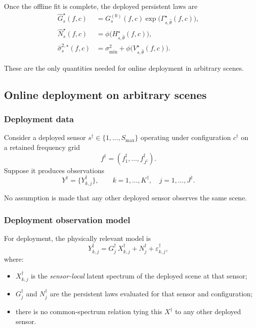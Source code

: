 Once the offline fit is complete, the deployed persistent laws are
\begin{align}
\widehat G_s^\star(f,c)
&=
G_s^{(0)}(f,c)
\exp\!\bigl(
\Gamma_{s,\widehat\theta}^\star(f,c)
\bigr),
\label{eq:deployed-persistent-gain}
\\
\widehat N_s^\star(f,c)
&=
\phi\!\bigl(
H_{s,\widehat\theta}^\star(f,c)
\bigr),
\label{eq:deployed-persistent-floor}
\\
\widehat \sigma_s^{2,\star}(f,c)
&=
\sigma_{\min}^2
+
\phi\!\bigl(
V_{s,\widehat\theta}^\star(f,c)
\bigr).
\label{eq:deployed-persistent-var}
\end{align}

These are the only quantities needed for online deployment in arbitrary
scenes.

\subsection{Online deployment on arbitrary scenes}

\subsubsection{Deployment data}

Consider a deployed sensor $s^\dagger\in\{1,\dots,S_{\max}\}$ operating under
configuration $c^\dagger$ on a retained frequency grid
\[
f^\dagger=(f^\dagger_1,\dots,f^\dagger_{J^\dagger}).
\]
Suppose it produces observations
\[
Y^\dagger=\{Y^\dagger_{k,j}\},
\qquad
k=1,\dots,K^\dagger,\quad
j=1,\dots,J^\dagger.
\]

No assumption is made that any other deployed sensor observes the same scene.

\subsubsection{Deployment observation model}

For deployment, the physically relevant model is
\begin{equation}
Y^\dagger_{k,j}
=
G^\dagger_j\,X^\dagger_{k,j}
+
N^\dagger_j
+
\varepsilon^\dagger_{k,j},
\label{eq:deployment-forward}
\end{equation}
where:
\begin{itemize}
    \item $X^\dagger_{k,j}$ is the \emph{sensor-local} latent spectrum of the
    deployed scene at that sensor;
    \item $G^\dagger_j$ and $N^\dagger_j$ are the persistent laws evaluated
    for that sensor and configuration;
    \item there is no common-spectrum relation tying this $X^\dagger$ to any
    other deployed sensor.
\end{itemize}

